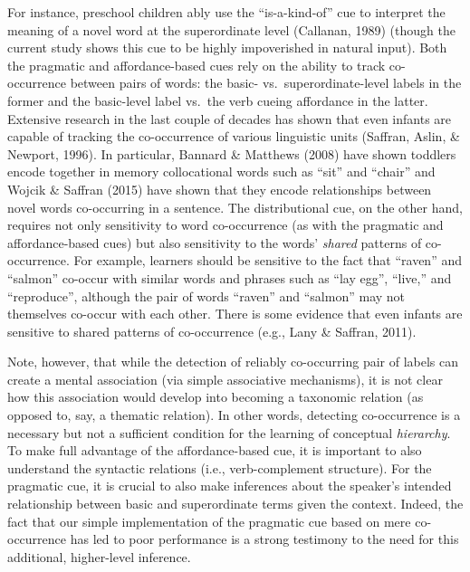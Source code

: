 \documentclass[english,,man]{apa6}
\begin{document}
For instance, preschool children ably use the \enquote{is-a-kind-of} cue to interpret the meaning of a novel word at the superordinate level (Callanan, 1989) (though the current study shows this cue to be highly impoverished in natural input). Both the pragmatic and affordance-based cues rely on the ability to track co-occurrence between pairs of words: the basic- vs.~superordinate-level labels in the former and the basic-level label vs.~the verb cueing affordance in the latter. Extensive research in the last couple of decades has shown that even infants are capable of tracking the co-occurrence of various linguistic units (Saffran, Aslin, \& Newport, 1996). In particular, Bannard \& Matthews (2008) have shown toddlers encode together in memory collocational words such as \enquote{sit} and \enquote{chair} and Wojcik \& Saffran (2015) have shown that they encode relationships between novel words co-occurring in a sentence. The distributional cue, on the other hand, requires not only sensitivity to word co-occurrence (as with the pragmatic and affordance-based cues) but also sensitivity to the words' \emph{shared} patterns of co-occurrence. For example, learners should be sensitive to the fact that \enquote{raven} and \enquote{salmon} co-occur with similar words and phrases such as \enquote{lay egg}, \enquote{live,} and \enquote{reproduce}, although the pair of words \enquote{raven} and \enquote{salmon} may not themselves co-occur with each other. There is some evidence that even infants are sensitive to shared patterns of co-occurrence (e.g., Lany \& Saffran, 2011).

Note, however, that while the detection of reliably co-occurring pair of labels can create a mental association (via simple associative mechanisms), it is not clear how this association would develop into becoming a taxonomic relation (as opposed to, say, a thematic relation). In other words, detecting co-occurrence is a necessary but not a sufficient condition for the learning of conceptual \emph{hierarchy}. To make full advantage of the affordance-based cue, it is important to also understand the syntactic relations (i.e., verb-complement structure). For the pragmatic cue, it is crucial to also make inferences about the speaker's intended relationship between basic and superordinate terms given the context. Indeed, the fact that our simple implementation of the pragmatic cue based on mere co-occurrence has led to poor performance is a strong testimony to the need for this additional, higher-level inference.
\end{document}
